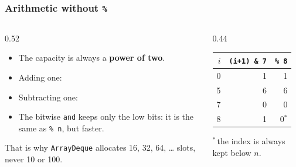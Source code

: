 \documentclass[aspectratio=169,10pt,compress]{beamer}
\begin{document}
\begin{frame}[t,fragile] \frametitle{Arithmetic without \texttt{\%}}
  \begin{columns}[T]
    \begin{column}{0.52\textwidth}
      \begin{itemize}\small
        \item The capacity is always a \textbf{power of two}.
        \item Adding one: 
        \item Subtracting one: 
        \item The bitwise \texttt{and} keeps only the low bits: it is the same as \texttt{\% n}, but faster.
      \end{itemize}
      \vspace{0.3em}
      \small That is why \texttt{ArrayDeque} allocates 16, 32, 64, \dots{} slots, never 10 or 100.
    \end{column}
    \begin{column}{0.44\textwidth}
      \begin{center}\footnotesize
      \begin{tabular}{rrr}
        \toprule
        $i$ & \texttt{(i+1) \& 7} & \texttt{\% 8} \\
        \midrule
        0 & 1 & 1 \\
        5 & 6 & 6 \\
        7 & 0 & 0 \\
        8 & 1 & 0$^{*}$ \\
        \bottomrule
      \end{tabular}
      \end{center}
      \scriptsize $^{*}$\,the index is always kept below $n$.
    \end{column}
  \end{columns}
\end{frame}
\end{document}
